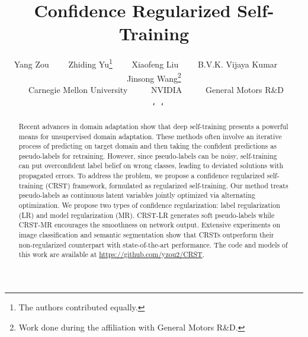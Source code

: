 \documentclass[10pt,twocolumn,letterpaper]{article}
\theoremstyle{plain}
\newcommand{\MYhref}[3][blue]{\href{#2}{\color{#1}{#3}}}
\begin{document}
\title{Confidence Regularized Self-Training}

\author{
Yang Zou~~~~
Zhiding Yu\thanks{The authors contributed equally.}~~~~
Xiaofeng Liu~~~~
B.V.K. Vijaya Kumar~~~~
Jinsong Wang\thanks{Work done during the affiliation with General Motors R\&D.}\\
~Carnegie Mellon University~~~~
~NVIDIA~~~~
~General Motors R\&D\\
{\small\Letter~~\tt
\MYhref[black]{mailto:yzou2@andrew.cmu.edu}{yzou2@andrew.cmu.edu}, 
\MYhref[black]{mailto:zhidingy@nvidia.com}{zhidingy@nvidia.com}, 
\MYhref[black]{mailto:liuxiaofeng@cmu.edu}{liuxiaofeng@cmu.edu}}
}

\maketitle

\renewcommand{\thefootnote}{\Letter}
\renewcommand*{\thefootnote}{\arabic{footnote}}

\ificcvfinal\thispagestyle{empty}\fi

\begin{abstract}
Recent advances in domain adaptation show that deep self-training presents a powerful means for unsupervised domain adaptation. These methods often involve an iterative process of predicting on target domain and then taking the confident predictions as pseudo-labels for retraining. However, since pseudo-labels can be noisy, self-training can put overconfident label belief on wrong classes, leading to deviated solutions with propagated errors. To address the problem, we propose a confidence regularized self-training (CRST) framework, formulated as regularized self-training. Our method treats pseudo-labels as continuous latent variables jointly optimized via alternating optimization. We propose two types of confidence regularization: label regularization (LR) and model regularization (MR). CRST-LR generates soft pseudo-labels while CRST-MR encourages the smoothness on network output. Extensive experiments on image classification and semantic segmentation show that CRSTs outperform their non-regularized counterpart with state-of-the-art performance. The code and models of this work are available at \href{https://github.com/yzou2/CRST}{https://github.com/yzou2/CRST}.
\end{abstract}
\end{document}
